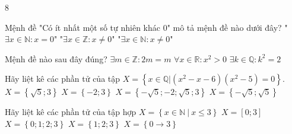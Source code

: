 \begin{indapan}{8}
\begin{ex}
	Mệnh đề "Có ít nhất một số tự nhiên khác 0" mô tả mệnh đề nào dưới đây?
	{"$\exists x\in\mathbb{N}:x=0$"}
	{"$\exists x\in\mathbb{Z}: x\neq 0$"}
	{\True "$\exists x\in\mathbb{N}:x\neq 0$"}
\end{ex}
\begin{ex}%
	Mệnh đề nào sau đây đúng?
	{\True $\exists m\in\mathbb{Z}:2m=m$}
	{$\forall x\in\mathbb{R}:x^2> 0$}
	{$\exists k\in\mathbb{Q}:k^2=2$}
\end{ex}
\begin{ex}%
	Hãy liệt kê các phần tử của tập $X=\left\{ x \in \mathbb{Q}| (x^2-x-6)(x^2-5)=0 \right\}$.
	\choice
	{$X=\left\{ \sqrt{5};3 \right\}$}
	{\True $X=\left\{ -2;3 \right\}$}
	{$X=\left\{ -\sqrt{5};-2;\sqrt{5}; 3 \right\}$}
	{$X=\left\{ -\sqrt{5};\sqrt{5}  \right\}$}
\end{ex}
\begin{ex}%
	Hãy liệt kê các phần tử của tập hợp $X=\left\{x \in \mathbb{N} \ |  \ x \leq 3\right\}$
	\choice
	{$X=\left[0;3\right]$}
	{\True $X=\left\{0;1;2;3\right\}$}
	{$X=\left\{1;2;3\right\}$}
	{$X=\left\{0  \longrightarrow 3\right\}$}
\end{ex}


\end{indapan}
